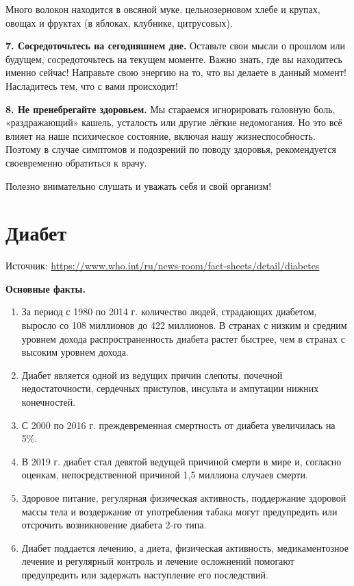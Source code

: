 Много волокон находится в овсяной муке, цельнозерновом хлебе и крупах, овощах и фруктах (в яблоках, клубнике, цитрусовых).

\textbf{7. Сосредоточьтесь на сегодняшнем дне.}  Оставьте свои мысли о прошлом или будущем, сосредоточьтесь на текущем моменте. Важно знать, где вы находитесь именно сейчас! Направьте свою энергию на то, что вы делаете в данный момент! Насладитесь тем, что с вами происходит!

\textbf{8. Не пренебрегайте здоровьем.} Мы стараемся игнорировать головную боль, «раздражающий» кашель, усталость или другие лёгкие недомогания. Но это всё влияет на наше психическое состояние, включая нашу жизнеспособность. Поэтому в случае симптомов и подозрений по поводу здоровья, рекомендуется своевременно обратиться к врачу.

Полезно внимательно слушать и уважать себя и свой организм!

\newpage
\section{Диабет}
Источник: \url{https://www.who.int/ru/news-room/fact-sheets/detail/diabetes}

\textbf{Основные факты.}
\begin{enumerate}
    \item За период с 1980 по 2014 г. количество людей, страдающих диабетом, выросло со 108 миллионов до 422 миллионов. В странах с низким и средним уровнем дохода распространенность диабета растет быстрее, чем в странах с высоким уровнем дохода.
    \item Диабет является одной из ведущих причин слепоты, почечной недостаточности, сердечных приступов, инсульта и ампутации нижних конечностей.
    \item С 2000 по 2016 г. преждевременная смертность от диабета увеличилась на 5\%.
    \item В 2019 г. диабет стал девятой ведущей причиной смерти в мире и, согласно оценкам, непосредственной причиной 1,5 миллиона случаев смерти.
    \item Здоровое питание, регулярная физическая активность, поддержание здоровой массы тела и воздержание от употребления табака могут предупредить или отсрочить возникновение диабета 2-го типа.
    \item Диабет поддается лечению, а диета, физическая активность, медикаментозное лечение и регулярный контроль и лечение осложнений помогают предупредить или задержать наступление его последствий.
\end{enumerate}

